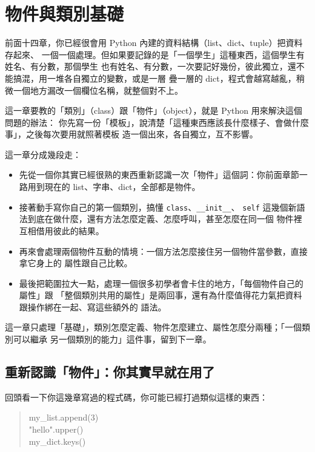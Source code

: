 \chapter{物件與類別基礎}
\label{ch:objects}

前面十四章，你已經很會用 Python 內建的資料結構（list、dict、tuple）把資料存起來、
一個一個處理。但如果要記錄的是「一個學生」這種東西，這個學生有姓名、有分數，那個學生
也有姓名、有分數，一次要記好幾份，彼此獨立，還不能搞混，用一堆各自獨立的變數，或是一層
疊一層的 dict，程式會越寫越亂，稍微一個地方漏改一個欄位名稱，就整個對不上。

這一章要教的「類別」（class）跟「物件」（object），就是 Python 用來解決這個問題的辦法：
你先寫一份「模板」，說清楚「這種東西應該長什麼樣子、會做什麼事」，之後每次要用就照著模板
造一個出來，各自獨立，互不影響。

這一章分成幾段走：

\begin{itemize}
\item 先從一個你其實已經很熟的東西重新認識一次「物件」這個詞：你前面章節一路用到現在的
list、字串、dict，全部都是物件。
\item 接著動手寫你自己的第一個類別，搞懂 \texttt{class}、\texttt{\_\_init\_\_}、
\texttt{self} 這幾個新語法到底在做什麼，還有方法怎麼定義、怎麼呼叫，甚至怎麼在同一個
物件裡互相借用彼此的結果。
\item 再來會處理兩個物件互動的情境：一個方法怎麼接住另一個物件當參數，直接拿它身上的
屬性跟自己比較。
\item 最後把範圍拉大一點，處理一個很多初學者會卡住的地方，「每個物件自己的屬性」跟
「整個類別共用的屬性」是兩回事，還有為什麼值得花力氣把資料跟操作綁在一起、寫這些額外的
語法。
\end{itemize}

這一章只處理「基礎」，類別怎麼定義、物件怎麼建立、屬性怎麼分兩種；「一個類別可以繼承
另一個類別的能力」這件事，留到下一章。

\section{重新認識「物件」：你其實早就在用了}
\label{sec:objects-recap}

回頭看一下你這幾章寫過的程式碼，你可能已經打過類似這樣的東西：

\begin{quote}
\ttfamily
my\_list.append(3) \\
"hello".upper() \\
my\_dict.keys()
\end{quote}

